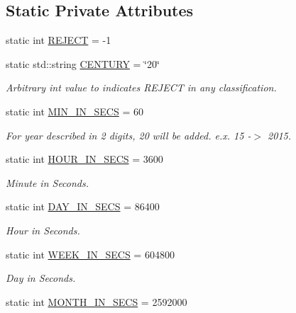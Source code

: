 \subsection*{Static Private Attributes}
\begin{DoxyCompactItemize}
\item 
static int \hyperlink{class_do_lah_1_1_date_time_parser_a23feb7cbc6832ca6931a2204752ce930}{R\+E\+J\+E\+C\+T} = -\/1
\item 
static std\+::string \hyperlink{class_do_lah_1_1_date_time_parser_adb080e964894e09a85f4b5314e4098d7}{C\+E\+N\+T\+U\+R\+Y} = \char`\"{}20\char`\"{}
\begin{DoxyCompactList}\small\item\em Arbitrary int value to indicates R\+E\+J\+E\+C\+T in any classification. \end{DoxyCompactList}\item 
static int \hyperlink{class_do_lah_1_1_date_time_parser_a6bcbe9c2772910a92e518a39f4ca81b7}{M\+I\+N\+\_\+\+I\+N\+\_\+\+S\+E\+C\+S} = 60
\begin{DoxyCompactList}\small\item\em For year described in 2 digits, 20 will be added. e.\+x. 15 -\/$>$ 2015. \end{DoxyCompactList}\item 
static int \hyperlink{class_do_lah_1_1_date_time_parser_ad860d83d2253ba7db8b7f405adc0a2c8}{H\+O\+U\+R\+\_\+\+I\+N\+\_\+\+S\+E\+C\+S} = 3600
\begin{DoxyCompactList}\small\item\em Minute in Seconds. \end{DoxyCompactList}\item 
static int \hyperlink{class_do_lah_1_1_date_time_parser_a829ee3acb25eecc96b6529d335edfbe7}{D\+A\+Y\+\_\+\+I\+N\+\_\+\+S\+E\+C\+S} = 86400
\begin{DoxyCompactList}\small\item\em Hour in Seconds. \end{DoxyCompactList}\item 
static int \hyperlink{class_do_lah_1_1_date_time_parser_a6e930ec6feb5cbfe0d3429bb20142d3c}{W\+E\+E\+K\+\_\+\+I\+N\+\_\+\+S\+E\+C\+S} = 604800
\begin{DoxyCompactList}\small\item\em Day in Seconds. \end{DoxyCompactList}\item 
static int \hyperlink{class_do_lah_1_1_date_time_parser_a32467508a17e5406b529eb61177264ee}{M\+O\+N\+T\+H\+\_\+\+I\+N\+\_\+\+S\+E\+C\+S} = 2592000

\end{DoxyCompactItemize}
